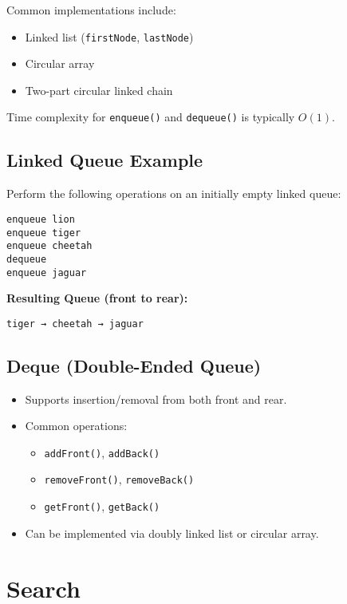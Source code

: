 \documentclass[11pt]{article}
\begin{document}
Common implementations include:
\begin{itemize}
  \item Linked list (\texttt{firstNode}, \texttt{lastNode})
  \item Circular array
  \item Two-part circular linked chain
\end{itemize}

Time complexity for \texttt{enqueue()} and \texttt{dequeue()} is typically $O(1)$.

\subsection*{Linked Queue Example}

Perform the following operations on an initially empty linked queue:

\begin{verbatim}
enqueue lion
enqueue tiger
enqueue cheetah
dequeue
enqueue jaguar
\end{verbatim}

\textbf{Resulting Queue (front to rear):}

\begin{verbatim}
tiger → cheetah → jaguar
\end{verbatim}

\subsection*{Deque (Double-Ended Queue)}
\begin{itemize}
  \item Supports insertion/removal from both front and rear.
  \item Common operations:
    \begin{itemize}
      \item \texttt{addFront()}, \texttt{addBack()}
      \item \texttt{removeFront()}, \texttt{removeBack()}
      \item \texttt{getFront()}, \texttt{getBack()}
    \end{itemize}
  \item Can be implemented via doubly linked list or circular array.
\end{itemize}



\hrulefill

\section*{Search}
\end{document}
